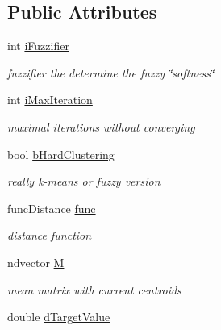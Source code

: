 \subsection*{Public Attributes}
\begin{DoxyCompactItemize}
\item 
\hypertarget{classkmeans_acf1eb9ee509965ca584bfe9ff96c9cb7}{int \hyperlink{classkmeans_acf1eb9ee509965ca584bfe9ff96c9cb7}{i\-Fuzzifier}}\label{classkmeans_acf1eb9ee509965ca584bfe9ff96c9cb7}

\begin{DoxyCompactList}\small\item\em fuzzifier the determine the fuzzy \char`\"{}softness\char`\"{} \end{DoxyCompactList}\item 
\hypertarget{classkmeans_a68624c205cc23a9337deceae11990427}{int \hyperlink{classkmeans_a68624c205cc23a9337deceae11990427}{i\-Max\-Iteration}}\label{classkmeans_a68624c205cc23a9337deceae11990427}

\begin{DoxyCompactList}\small\item\em maximal iterations without converging \end{DoxyCompactList}\item 
\hypertarget{classkmeans_ad68768a1c645e9acdf4e39322ac0a987}{bool \hyperlink{classkmeans_ad68768a1c645e9acdf4e39322ac0a987}{b\-Hard\-Clustering}}\label{classkmeans_ad68768a1c645e9acdf4e39322ac0a987}

\begin{DoxyCompactList}\small\item\em really k-\/means or fuzzy version \end{DoxyCompactList}\item 
\hypertarget{classkmeans_a1fc722c0a48af163fdcb9f79ebf8ff5c}{func\-Distance \hyperlink{classkmeans_a1fc722c0a48af163fdcb9f79ebf8ff5c}{func}}\label{classkmeans_a1fc722c0a48af163fdcb9f79ebf8ff5c}

\begin{DoxyCompactList}\small\item\em distance function \end{DoxyCompactList}\item 
\hypertarget{classkmeans_a638c89975e51f194f53d324fdc7fce79}{ndvector \hyperlink{classkmeans_a638c89975e51f194f53d324fdc7fce79}{M}}\label{classkmeans_a638c89975e51f194f53d324fdc7fce79}

\begin{DoxyCompactList}\small\item\em mean matrix with current centroids \end{DoxyCompactList}\item 
\hypertarget{classkmeans_af54543a70492f500179c5eb3c0334494}{double \hyperlink{classkmeans_af54543a70492f500179c5eb3c0334494}{d\-Target\-Value}}\label{classkmeans_af54543a70492f500179c5eb3c0334494}


\end{DoxyCompactItemize}
